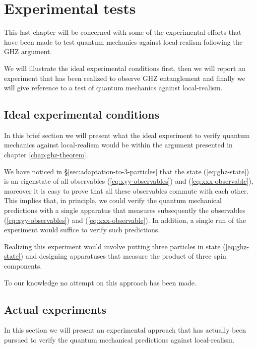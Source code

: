 \chapter{Experimental tests}
\label{chap:ghz-experiments}
This last chapter will be concerned with some of the experimental efforts that have been made to test quantum mechanics against local-realism following the GHZ argument.

We will illustrate the ideal experimental conditions first, then we will report an experiment that has been realized to observe GHZ entanglement and finally we will give reference to a test of quantum mechanics against local-realism.

\section{Ideal experimental conditions}
In this brief section we will present what the ideal experiment to verify quantum mechanics against local-realism would be within the argument presented in chapter \ref{chap:ghz-theorem}.%

We have noticed in \S \ref{sec:adaptation-to-3-particles} that the state (\ref{eq:ghz-state}) is an eigenstate of all observables (\ref{eq:xyy-observables}) and (\ref{eq:xxx-observable}), moreover it is easy to prove that all these observables commute with each other. This implies that, in principle, we could verify the quantum mechanical predictions with a single apparatus that measures subsequently the observables (\ref{eq:xyy-observables}) and (\ref{eq:xxx-observable}). In addition, a single run of the experiment would suffice to verify such predictions.

Realizing this experiment would involve putting three particles in state (\ref{eq:ghz-state}) and designing apparatuses that measure the product of three spin components.

To our knowledge no attempt on this approach has been made. 


\section{Actual experiments}
In this section we will present an experimental approach that has actually been pursued to verify the quantum mechanical predictions against local-realism.

